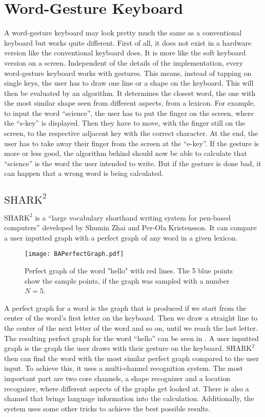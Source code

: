\section{Word-Gesture Keyboard}
A word-gesture keyboard may look pretty much the same as a conventional keyboard but works quite different. First of all, it does not exist in a hardware version like the conventional keyboard does. It is more like the soft keyboard version on a screen. Independent of the details of the implementation, every word-gesture keyboard works with gestures. This means, instead of tapping on single keys, the user has to draw one line or a shape on the keyboard. This will then be evaluated by an algorithm. It determines the closest word, the one with the most similar shape seen from different aspects, from a lexicon. For example, to input the word ``science'', the user has to put the finger on the screen, where the ``s-key'' is displayed. Then they have to move, with the finger still on the screen, to the respective adjacent key with the correct character. At the end, the user has to take away their finger from the screen at the ``e-key''. If the gesture is more or less good, the algorithm behind should now be able to calculate that ``science'' is the word the user intended to write. But if the gesture is done bad, it can happen that a wrong word is being calculated. 

\subsection{$\text{SHARK}^2$}
\label{SHARK2}
$\text{SHARK}^2$ is a ``large vocabulary shorthand writing system for pen-based computers'' \cite{Kristensson2004SHARK2AL} developed by Shumin Zhai and Per-Ola Kristensson. It can compare a user inputted graph with a perfect graph of any word in a given lexicon.
\begin{figure}[H]
    \centering
    \texttt{[image: BAPerfectGraph.pdf]}
    \caption{Perfect graph of the word "hello" with red lines. The 5 blue points show the sample points, if the graph was sampled with a number $N = 5$.}
    \label{fig:PerfectGraph}
\end{figure}
A perfect graph for a word is the graph that is produced if we start from the center of the word's first letter on the keyboard. Then we draw a straight line to the center of the next letter of the word and so on, until we reach the last letter. The resulting perfect graph for the word ``hello'' can be seen in . A user inputted graph is the graph the user draws with their gesture on the keyboard. $\text{SHARK}^2$ then can find the word with the most similar perfect graph compared to the user input. To achieve this, it uses a multi-channel recognition system. The most important part are two core channels, a shape recognizer and a location recognizer, where different aspects of the graphs get looked at. There is also a channel that brings language information into the calculation. Additionally, the system uses some other tricks to achieve the best possible results.

